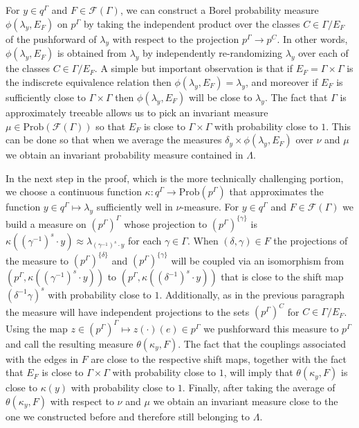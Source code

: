 \documentclass[12pt]{amsart}
\theoremstyle{definition}
\def\cal{\mathcal}
\newcommand{\Prob}{\mathrm{Prob}}
\begin{document}
For $y \in q^\Gamma$ and $F \in \cal F(\Gamma)$, we can construct a Borel probability measure $\phi(\lambda_y, E_F)$ on $p^\Gamma$ by taking the independent product over the classes $C \in \Gamma / E_F$ of the pushforward of $\lambda_y$ with respect to the projection $p^\Gamma \rightarrow p^C$. In other words, $\phi(\lambda_y, E_F)$ is obtained from $\lambda_y$ by independently re-randomizing $\lambda_y$ over each of the classes $C \in \Gamma / E_F$. A simple but important observation is that if $E_F = \Gamma \times \Gamma$ is the indiscrete equivalence relation then $\phi(\lambda_y, E_F) = \lambda_y$, and moreover if $E_F$ is sufficiently close to $\Gamma \times \Gamma$ then $\phi(\lambda_y, E_F)$ will be close to $\lambda_y$. The fact that $\Gamma$ is approximately treeable allows us to pick an invariant measure $\mu \in \Prob(\cal F(\Gamma))$ so that $E_F$ is close to $\Gamma \times \Gamma$ with probability close to $1$. This can be done so that when we average the measures $\delta_y \times \phi(\lambda_y, E_F)$ over $\nu$ and $\mu$ we obtain an invariant probability measure contained in $\Lambda$.

In the next step in the proof, which is the more technically challenging portion, we choose a continuous function $\kappa : q^\Gamma \rightarrow \Prob(p^\Gamma)$ that approximates the function $y \in q^\Gamma \mapsto \lambda_y$ sufficiently well in $\nu$-measure. For $y \in q^\Gamma$ and $F \in \cal F(\Gamma)$ we build a measure on $(p^\Gamma)^\Gamma$ whose projection to $(p^\Gamma)^{\{\gamma\}}$ is $\kappa((\gamma^{-1})^s \cdot y) \approx \lambda_{(\gamma^{-1})^s \cdot y}$ for each $\gamma \in \Gamma$. When $(\delta, \gamma) \in F$ the projections of the measure to $(p^\Gamma)^{\{\delta\}}$ and $(p^\Gamma)^{\{\gamma\}}$ will be coupled via an isomorphism from $(p^\Gamma, \kappa((\gamma^{-1})^s \cdot y))$ to $(p^\Gamma, \kappa((\delta^{-1})^s \cdot y))$ that is close to the shift map $(\delta^{-1} \gamma)^s$ with probability close to $1$. Additionally, as in the previous paragraph the measure will have independent projections to the sets $(p^\Gamma)^C$ for $C \in \Gamma / E_F$. Using the map $z \in (p^\Gamma)^\Gamma \mapsto z(\cdot)(e) \in p^\Gamma$ we pushforward this measure to $p^\Gamma$ and call the resulting measure $\theta(\kappa_y, F)$. The fact that the couplings associated with the edges in $F$ are close to the respective shift maps, together with the fact that $E_F$ is close to $\Gamma \times \Gamma$ with probability close to $1$, will imply that $\theta(\kappa_y, F)$ is close to $\kappa(y)$ with probability close to $1$. Finally, after taking the average of $\theta(\kappa_y, F)$ with respect to $\nu$ and $\mu$ we obtain an invariant measure close to the one we constructed before and therefore still belonging to $\Lambda$.
\end{document}
